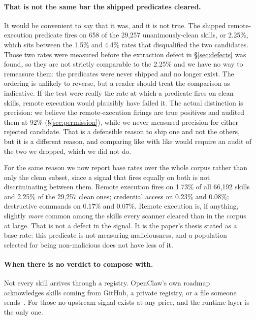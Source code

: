 \documentclass[10pt]{article}
\begin{document}
\paragraph{That is not the same bar the shipped predicates cleared.} It would be
convenient to say that it was, and it is not true. The shipped remote-execution
predicate fires on 658 of the 29,257 unanimously-clean skills, or 2.25\%, which sits
between the 1.5\% and 4.4\% rates that disqualified the two candidates. Those two
rates were measured before the extraction defect in \S\ref{sec:defects} was found, so
they are not strictly comparable to the 2.25\% and we have no way to remeasure them:
the predicates were never shipped and no longer exist. The ordering is unlikely to
reverse, but a reader should treat the comparison as indicative. If the test were
really the rate at which a predicate fires on clean skills, remote execution would
plausibly have failed it. The actual distinction is precision: we believe the
remote-execution firings are true positives and audited them at 92\%
(\S\ref{sec:permission}), while we never measured precision for either rejected
candidate. That is a defensible reason to ship one and not the others, but it is a
different reason, and comparing like with like would require an audit of the two we
dropped, which we did not do.

For the same reason we now report base rates over the whole corpus rather than only
the clean subset, since a signal that fires equally on both is not discriminating
between them. Remote execution fires on 1.73\% of all 66,192 skills and 2.25\% of the
29,257 clean ones; credential access on 0.23\% and 0.08\%; destructive commands on
0.17\% and 0.07\%. Remote execution is, if anything, slightly \emph{more} common among
the skills every scanner cleared than in the corpus at large. That is not a defect in
the signal. It is the paper's thesis stated as a base rate: this predicate is not
measuring maliciousness, and a population selected for being non-malicious does not
have less of it.

\paragraph{When there is no verdict to compose with.} Not every skill arrives
through a registry. OpenClaw's own roadmap acknowledges skills coming from GitHub,
a private registry, or a file someone sends~\cite{openclawroadmap}. For those no upstream signal exists at any price, and the runtime layer is the only
one.
\end{document}
